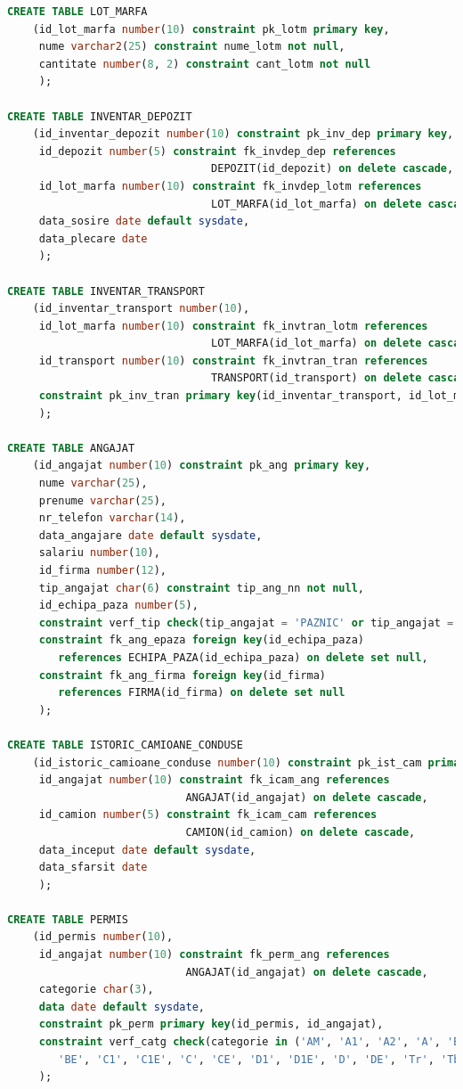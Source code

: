\documentclass[12pt, a4paper]{article}
\begin{document}
\begin{lstlisting}[language=SQL]
CREATE TABLE LOT_MARFA
    (id_lot_marfa number(10) constraint pk_lotm primary key,
     nume varchar2(25) constraint nume_lotm not null,
     cantitate number(8, 2) constraint cant_lotm not null
     );
     
CREATE TABLE INVENTAR_DEPOZIT
    (id_inventar_depozit number(10) constraint pk_inv_dep primary key,
     id_depozit number(5) constraint fk_invdep_dep references 
                                DEPOZIT(id_depozit) on delete cascade,
     id_lot_marfa number(10) constraint fk_invdep_lotm references 
                                LOT_MARFA(id_lot_marfa) on delete cascade,
     data_sosire date default sysdate,
     data_plecare date
     );
     
CREATE TABLE INVENTAR_TRANSPORT
    (id_inventar_transport number(10),
     id_lot_marfa number(10) constraint fk_invtran_lotm references
                                LOT_MARFA(id_lot_marfa) on delete cascade,
     id_transport number(10) constraint fk_invtran_tran references 
                                TRANSPORT(id_transport) on delete cascade,
     constraint pk_inv_tran primary key(id_inventar_transport, id_lot_marfa)
     );
     
CREATE TABLE ANGAJAT
    (id_angajat number(10) constraint pk_ang primary key,
     nume varchar(25),
     prenume varchar(25),
     nr_telefon varchar(14),
     data_angajare date default sysdate,
     salariu number(10),
     id_firma number(12),
     tip_angajat char(6) constraint tip_ang_nn not null,
     id_echipa_paza number(5),
     constraint verf_tip check(tip_angajat = 'PAZNIC' or tip_angajat = 'SOFER'),
     constraint fk_ang_epaza foreign key(id_echipa_paza) 
        references ECHIPA_PAZA(id_echipa_paza) on delete set null,
     constraint fk_ang_firma foreign key(id_firma) 
        references FIRMA(id_firma) on delete set null
     );
     
CREATE TABLE ISTORIC_CAMIOANE_CONDUSE
    (id_istoric_camioane_conduse number(10) constraint pk_ist_cam primary key,
     id_angajat number(10) constraint fk_icam_ang references 
                            ANGAJAT(id_angajat) on delete cascade,
     id_camion number(5) constraint fk_icam_cam references 
                            CAMION(id_camion) on delete cascade,
     data_inceput date default sysdate,
     data_sfarsit date
     );
     
CREATE TABLE PERMIS
    (id_permis number(10),
     id_angajat number(10) constraint fk_perm_ang references 
                            ANGAJAT(id_angajat) on delete cascade,
     categorie char(3),
     data date default sysdate,
     constraint pk_perm primary key(id_permis, id_angajat),
     constraint verf_catg check(categorie in ('AM', 'A1', 'A2', 'A', 'B1', 'B',
        'BE', 'C1', 'C1E', 'C', 'CE', 'D1', 'D1E', 'D', 'DE', 'Tr', 'Tb', 'Tv'))
     );
     

\end{lstlisting}
\end{document}
